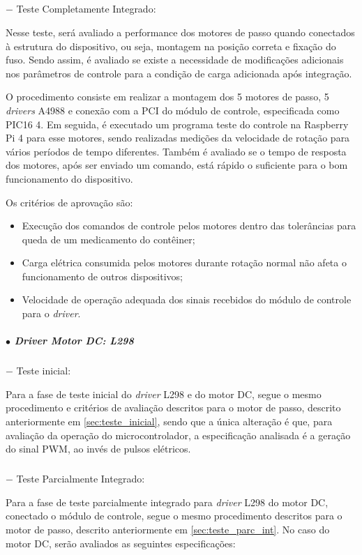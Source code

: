 \subparagraph*{} $-$ Teste Completamente Integrado:\label{sec:teste_comp_int}

Nesse teste, será avaliado a performance dos motores de passo quando conectados à estrutura do dispositivo, ou seja, montagem na posição correta e fixação do fuso. Sendo assim, é avaliado se existe a necessidade de modificações adicionais nos parâmetros de controle para a condição de carga adicionada após integração.

O procedimento consiste em realizar a montagem dos 5 motores de passo, 5 \textit{drivers} A4988 e conexão com a PCI do módulo de controle, especificada como PIC16 4. Em seguida, é executado um programa teste do controle na Raspberry Pi 4 para esse motores, sendo realizadas medições da velocidade de rotação para vários períodos de tempo diferentes. Também é avaliado se o tempo de resposta dos motores, após ser enviado um comando, está rápido o suficiente para o bom funcionamento do dispositivo. 

Os critérios de aprovação são:

\begin{itemize}
    \item Execução dos comandos de controle pelos motores dentro das tolerâncias para queda de um medicamento do contêiner;
    \item Carga elétrica consumida pelos motores durante rotação normal não afeta o funcionamento de outros dispositivos;
    \item Velocidade de operação adequada dos sinais recebidos do módulo de controle para o \textit{driver}.
\end{itemize}


\subparagraph*{$\bullet$ \textit{Driver} Motor DC: L298} \hfill

\subparagraph*{} $-$ Teste inicial:

Para a fase de teste inicial do \textit{driver} L298 e do motor DC, segue o mesmo procedimento e critérios de avaliação descritos para o motor de passo, descrito anteriormente em \ref{sec:teste_inicial}, sendo que a única alteração é que, para avaliação da operação do microcontrolador, a especificação analisada é a geração do sinal PWM, ao invés de pulsos elétricos. 

\subparagraph*{} $-$ Teste Parcialmente Integrado:

Para a fase de teste parcialmente integrado para \textit{driver} L298 do motor DC, conectado o módulo de controle, segue o mesmo procedimento descritos para o motor de passo, descrito anteriormente em \ref{sec:teste_parc_int}. No caso do motor DC, serão avaliados as seguintes especificações: 

